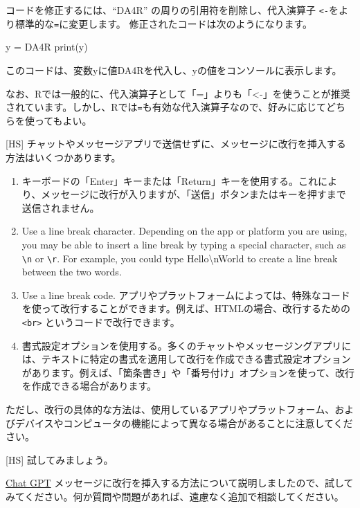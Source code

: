 \documentclass[
]{bxjsbook}
\newenvironment{Shaded}{\begin{snugshade}}{\end{snugshade}}
\newcommand{\FunctionTok}[1]{\textcolor[rgb]{0.00,0.00,0.00}{#1}}
\newcommand{\NormalTok}[1]{#1}
\newcommand{\OtherTok}[1]{\textcolor[rgb]{0.56,0.35,0.01}{#1}}
\theoremstyle{definition}
\theoremstyle{definition}
\theoremstyle{definition}
\theoremstyle{definition}
\theoremstyle{remark}
\begin{document}
コードを修正するには、``DA4R'' の周りの引用符を削除し、代入演算子 \texttt{\textless{}-}をより標準的な\texttt{=}に変更します。 修正されたコードは次のようになります。

\begin{Shaded}
\begin{Highlighting}[]
\NormalTok{y }\OtherTok{=}\NormalTok{ DA4R}
\FunctionTok{print}\NormalTok{(y)}
\end{Highlighting}
\end{Shaded}

このコードは、変数yに値DA4Rを代入し、yの値をコンソールに表示します。

なお、Rでは一般的に、代入演算子として「=」よりも「\textless-」を使うことが推奨されています。しかし、Rでは\texttt{=}も有効な代入演算子なので、好みに応じてどちらを使ってもよい。

{[}HS{]} チャットやメッセージアプリで送信せずに、メッセージに改行を挿入する方法はいくつかあります。

\begin{enumerate}
\def\labelenumi{\arabic{enumi}.}
\item
  キーボードの「Enter」キーまたは「Return」キーを使用する。これにより、メッセージに改行が入りますが、「送信」ボタンまたはキーを押すまで送信されません。
\item
  Use a line break character. Depending on the app or platform you are using, you may be able to insert a line break by typing a special character, such as \texttt{\textbackslash{}n} or \texttt{\textbackslash{}r}. For example, you could type Hello\textbackslash nWorld to create a line break between the two words.
\item
  Use a line break code. アプリやプラットフォームによっては、特殊なコードを使って改行することができます。例えば、HTMLの場合、改行するための
  \texttt{\textless{}br\textgreater{}}
  というコードで改行できます。
\item
  書式設定オプションを使用する。多くのチャットやメッセージングアプリには、テキストに特定の書式を適用して改行を作成できる書式設定オプションがあります。例えば、「箇条書き」や「番号付け」オプションを使って、改行を作成できる場合があります。
\end{enumerate}

ただし、改行の具体的な方法は、使用しているアプリやプラットフォーム、およびデバイスやコンピュータの機能によって異なる場合があることに注意してください。

{[}HS{]} 試してみましょう。

\protect\hyperlink{chatgpt}{Chat GPT} メッセージに改行を挿入する方法について説明しましたので、試してみてください。何か質問や問題があれば、遠慮なく追加で相談してください。
\end{document}
